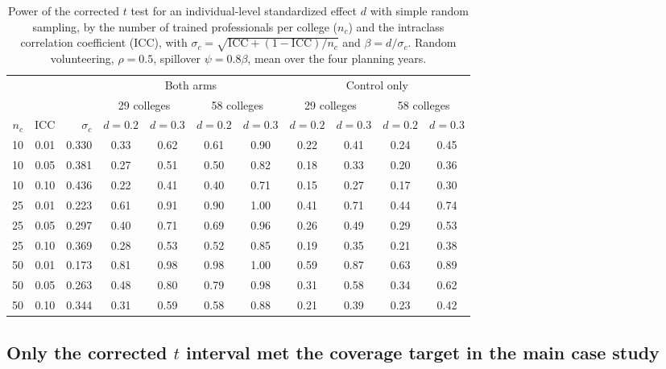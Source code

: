\documentclass[11pt]{article}
\begin{document}
\iffullsi
\begin{table}[!htb]
\small
\centering
\caption{Power of the corrected $t$ test for an individual-level standardized effect $d$ with simple random sampling, by the number of trained professionals per college ($n_c$) and the intraclass correlation coefficient (ICC), with $\sigma_c = \sqrt{\text{ICC} + (1-\text{ICC})/n_c}$ and $\beta = d/\sigma_c$. Random volunteering, $\rho = 0.5$, spillover $\psi = 0.8\beta$, mean over the four planning years.}
\label{tab:nc-translation}
\begin{tabular}{rrrcccccccc}
\toprule
& & & \multicolumn{4}{c}{Both arms} & \multicolumn{4}{c}{Control only} \\
\cmidrule(lr){4-7}\cmidrule(lr){8-11}
& & & \multicolumn{2}{c}{29 colleges} & \multicolumn{2}{c}{58 colleges} & \multicolumn{2}{c}{29 colleges} & \multicolumn{2}{c}{58 colleges} \\
$n_c$ & ICC & $\sigma_c$ & $d=0.2$ & $d=0.3$ & $d=0.2$ & $d=0.3$ & $d=0.2$ & $d=0.3$ & $d=0.2$ & $d=0.3$ \\
\midrule
10 & 0.01 & 0.330 & 0.33 & 0.62 & 0.61 & 0.90 & 0.22 & 0.41 & 0.24 & 0.45 \\
10 & 0.05 & 0.381 & 0.27 & 0.51 & 0.50 & 0.82 & 0.18 & 0.33 & 0.20 & 0.36 \\
10 & 0.10 & 0.436 & 0.22 & 0.41 & 0.40 & 0.71 & 0.15 & 0.27 & 0.17 & 0.30 \\
25 & 0.01 & 0.223 & 0.61 & 0.91 & 0.90 & 1.00 & 0.41 & 0.71 & 0.44 & 0.74 \\
25 & 0.05 & 0.297 & 0.40 & 0.71 & 0.69 & 0.96 & 0.26 & 0.49 & 0.29 & 0.53 \\
25 & 0.10 & 0.369 & 0.28 & 0.53 & 0.52 & 0.85 & 0.19 & 0.35 & 0.21 & 0.38 \\
50 & 0.01 & 0.173 & 0.81 & 0.98 & 0.98 & 1.00 & 0.59 & 0.87 & 0.63 & 0.89 \\
50 & 0.05 & 0.263 & 0.48 & 0.80 & 0.79 & 0.98 & 0.31 & 0.58 & 0.34 & 0.62 \\
50 & 0.10 & 0.344 & 0.31 & 0.59 & 0.58 & 0.88 & 0.21 & 0.39 & 0.23 & 0.42 \\
\bottomrule
\end{tabular}
\end{table}
\fi


\subsection{\texorpdfstring{Only the corrected \(t\) interval met the coverage target in the main case study}{Only the corrected t interval met the coverage target in the main case study}}\label{interval-calibration}
\end{document}
